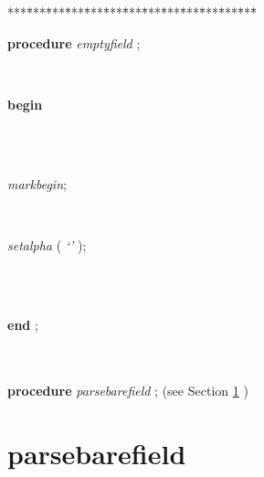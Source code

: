 \begin{tabbing}
***\=***\=***\=***\=***\=***\=***\=***\=***\=***\=***\=***\=***\=\kill
\parbox{14cm}{\textsf{\textbf{procedure}  \textit{emptyfield} ;}}\\
\+\parbox{14cm}{\textsf{\textbf{begin} }}\\
\\
\parbox{14cm}{\textsf{\textit{markbegin}}; }\\
\parbox{14cm}{\textsf{\textit{setalpha} (\textit{\textrm{\textup { `' } }})}; }\\
\\
\<\-\parbox{14cm}{\textsf{\textbf{end} ;}}\\
\\
\+\textsf{\textbf{procedure}  \textit{parsebarefield} ;} (see Section \ref{sec:csvfilereader/getdatamatrix/recursedown/recurse/getcolheaders/recurse/getrowheaders/recurse/colcount/getcell/removetrailingnull/onlynulls/rowcount/isint/printcsv/parsecsvfile/thetoken/peek/isoneof/nextsymbol/have/haveoneof/initialise/resolvealpha/resolvedigits/resolvetoken/markbegin/markend/setalpha/emptyfieldparsebarefield} )\\
\end{tabbing}
\section{parsebarefield}\label{sec:csvfilereader/getdatamatrix/recursedown/recurse/getcolheaders/recurse/getrowheaders/recurse/colcount/getcell/removetrailingnull/onlynulls/rowcount/isint/printcsv/parsecsvfile/thetoken/peek/isoneof/nextsymbol/have/haveoneof/initialise/resolvealpha/resolvedigits/resolvetoken/markbegin/markend/setalpha/emptyfieldparsebarefield}

